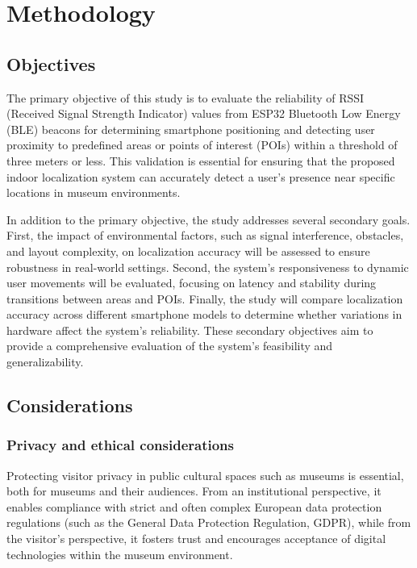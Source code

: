 \chapter{Methodology}
\label{chap:methodology}

\section{Objectives}

The primary objective of this study is to evaluate the reliability of RSSI (Received Signal Strength Indicator) values from ESP32 Bluetooth Low Energy (BLE) beacons for determining smartphone positioning and detecting user proximity to predefined areas or points of interest (POIs) within a threshold of three meters or less. This validation is essential for ensuring that the proposed indoor localization system can accurately detect a user's presence near specific locations in museum environments.

In addition to the primary objective, the study addresses several secondary goals. First, the impact of environmental factors, such as signal interference, obstacles, and layout complexity, on localization accuracy will be assessed to ensure robustness in real-world settings. Second, the system’s responsiveness to dynamic user movements will be evaluated, focusing on latency and stability during transitions between areas and POIs. Finally, the study will compare localization accuracy across different smartphone models to determine whether variations in hardware affect the system’s reliability. These secondary objectives aim to provide a comprehensive evaluation of the system’s feasibility and generalizability.

\section{Considerations}

\subsection{Privacy and ethical considerations}

Protecting visitor privacy in public cultural spaces such as museums is essential, both for museums and their audiences. From an institutional perspective, it enables compliance with strict and often complex European data protection regulations (such as the General Data Protection Regulation, GDPR), while from the visitor's perspective, it fosters trust and encourages acceptance of digital technologies within the museum environment.

